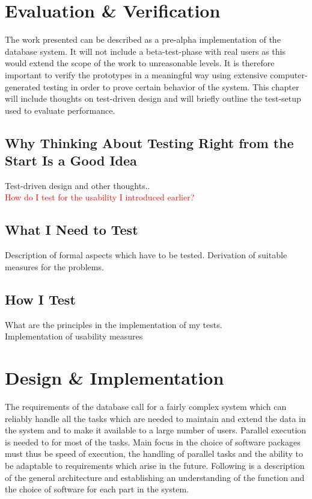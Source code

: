 \documentclass[twoside, 11pt]{scrartcl}
\begin{document}
\section{Evaluation \& Verification}
\label{sec:evaluation}
The work presented can be described as a pre-alpha implementation of the database system. It will not include a beta-test-phase with real users as this would extend the scope of the work to unreasonable levels. It is therefore important to verify the prototypes in a meaningful way using extensive computer-generated testing in order to prove certain behavior of the system. This chapter will include thoughts on test-driven design and will briefly outline the test-setup used to evaluate performance.
\subsection{Why Thinking About Testing Right from the Start Is a Good Idea}
Test-driven design and other thoughts..\\
\textcolor{red}{How do I test for the usability I introduced earlier?}
\subsection{What I Need to Test}
Description of formal aspects which have to be tested. Derivation of suitable measures for the problems.
\subsection{How I Test}
What are the principles in the implementation of my tests.\\
Implementation of usability measures
 

\section{Design \& Implementation}
\label{sec:implementation}
The requirements of the database call for a fairly complex system which can reliably handle all the tasks which are needed to maintain and extend the data in the system and to make it available to a large number of users. Parallel execution is needed to for most of the tasks. Main focus in the choice of software packages must thus be speed of execution, the handling of parallel tasks and the ability to be adaptable to requirements which arise in the future. 
Following is a description of the general architecture and establishing an understanding of the function and the choice of software for each part in the system.
\end{document}
